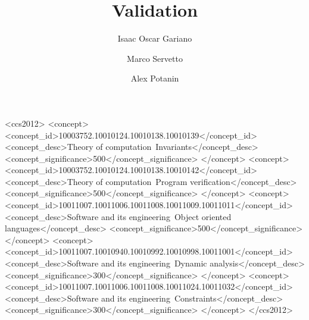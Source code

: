 \documentclass[english,submission,code=tt]{programming}
\theoremstyle{plain}
\begin{document}
\title{Validation}
\author{Isaac Oscar Gariano}
\author{Marco Servetto}
\author{Alex Potanin}


\begin{CCSXML}
<ccs2012>
	<concept>
		<concept_id>10003752.10010124.10010138.10010139</concept_id>
		<concept_desc>Theory of computation~Invariants</concept_desc>
		<concept_significance>500</concept_significance>
	</concept>
	<concept>
		<concept_id>10003752.10010124.10010138.10010142</concept_id>
		<concept_desc>Theory of computation~Program verification</concept_desc>
		<concept_significance>500</concept_significance>
	</concept>
	<concept>
		<concept_id>10011007.10011006.10011008.10011009.10011011</concept_id>
		<concept_desc>Software and its engineering~Object oriented languages</concept_desc>
		<concept_significance>500</concept_significance>
	</concept>
	<concept>
		<concept_id>10011007.10010940.10010992.10010998.10011001</concept_id>
		<concept_desc>Software and its engineering~Dynamic analysis</concept_desc>
		<concept_significance>300</concept_significance>
	</concept>
	<concept>
		<concept_id>10011007.10011006.10011008.10011024.10011032</concept_id>
		<concept_desc>Software and its engineering~Constraints</concept_desc>
		<concept_significance>300</concept_significance>
	</concept>
</ccs2012>
\end{CCSXML}


\maketitle
\end{document}
